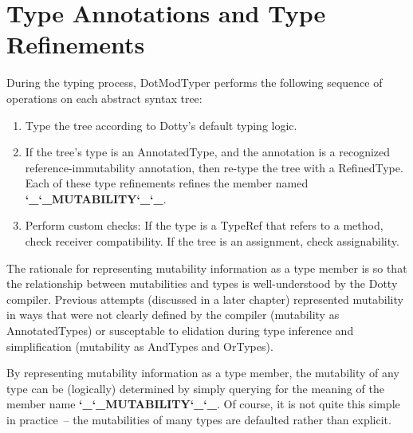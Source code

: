 \documentclass[11pt]{report}
\newcommand{\und}{\char`_}
\newcommand{\MUTABILITY}{\und\und MUTABILITY\und\und }
\newcommand{\cdf}{\bf\ttfamily} %
\newcommand{\cd}{\cdf\small}  %
\begin{document}
\section{Type Annotations and Type Refinements} \label{sec:annotations-to-refinements}

During the typing process, DotModTyper performs the following sequence of operations on each abstract syntax tree:
\begin{enumerate}
\item Type the tree according to Dotty's default typing logic.
\item If the tree's type is an AnnotatedType, and the annotation is a recognized reference-immutability annotation, then re-type the tree with a RefinedType. Each of these type refinements refines the member named {\cd \MUTABILITY}.%
\item Perform custom checks: If the type is a TypeRef that refers to a method, check receiver compatibility. If the tree is an assignment, check assignability.
\end{enumerate}

The rationale for representing mutability information as a type member is so that the relationship between mutabilities and types is well-understood by the Dotty compiler. Previous attempts (discussed in a later chapter) represented mutability in ways that were not clearly defined by the compiler (mutability as AnnotatedTypes) or susceptable to elidation during type inference and simplification (mutability as AndTypes and OrTypes).

By representing mutability information as a type member, the mutability of any type can be (logically) determined by simply querying for the meaning of the member name {\cd \MUTABILITY}. Of course, it is not quite this simple in practice~-- the mutabilities of many types are defaulted rather than explicit.

\end{document}
